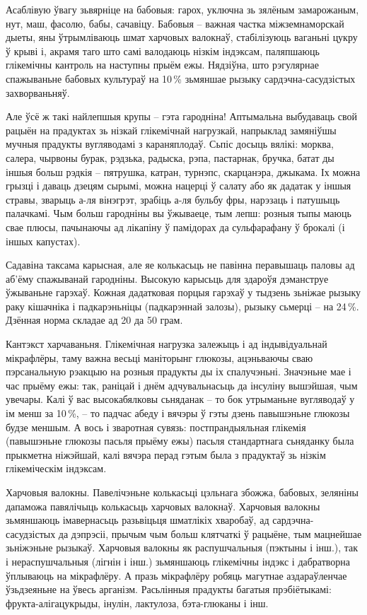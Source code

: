 Асаблівую ўвагу зьвярніце на бабовыя: гарох, уключна зь зялёным замарожаным, нут, маш, фасолю, бабы, сачавіцу. Бабовыя – важная частка міжземнаморскай дыеты, яны ўтрымліваюць шмат харчовых валокнаў, стабілізуюць ваганьні цукру ў крыві і, акрамя таго што самі валодаюць нізкім індэксам, паляпшаюць глікемічны кантроль на наступны прыём ежы. Нядзіўна, што рэгулярнае спажываньне бабовых культураў на 10\,\% зьмяншае рызыку сардэчна-сасудзістых захворваньняў.

Але ўсё ж такі найлепшыя крупы – гэта гародніна! Аптымальна выбудаваць свой рацыён на прадуктах зь нізкай глікемічнай нагрузкай, напрыклад замяніўшы мучныя прадукты вугляводамі з караняплодаў. Сьпіс досыць вялікі: морква, салера, чырвоны бурак, рэдзька, радыска, рэпа, пастарнак, бручка, батат ды іншыя больш рэдкія – пятрушка, катран, турнэпс, скарцанэра, джыкама. Іх можна грызці і даваць дзецям сырымі, можна нацерці ў салату або як дадатак у іншыя стравы, зварыць а-ля вінэгрэт, зрабіць а-ля бульбу фры, нарэзаць і патушыць палачкамі. Чым больш гародніны вы ўжываеце, тым лепш: розныя тыпы маюць свае плюсы, пачынаючы ад лікапіну ў памідорах да сульфарафану ў брокалі (і іншых капустах).

Садавіна таксама карысная, але яе колькасьць не павінна перавышаць паловы ад аб'ёму спажыванай гародніны. Высокую карысьць для здароўя дэманструе ўжываньне гарэхаў. Кожная дадатковая порцыя гарэхаў у тыдзень зьніжае рызыку раку кішачніка і падкарэньніцы (падкарэннай залозы), рызыку сьмерці – на 24\,\%. Дзённая норма складае ад 20 да 50 грам.

Кантэкст харчаваньня. Глікемічная нагрузка залежыць і ад індывідуальнай мікрафлёры, таму важна весьці маніторынг глюкозы, ацэньваючы сваю пэрсанальную рэакцыю на розныя прадукты ды іх спалучэньні. Значэньне мае і час прыёму ежы: так, раніцай і днём адчувальнасьць да інсуліну вышэйшая, чым увечары. Калі ў вас высокабялковы сьняданак – то бок утрыманьне вугляводаў у ім менш за 10\,\%, -- то падчас абеду і вячэры ў гэты дзень павышэньне глюкозы будзе меншым. А вось і зваротная сувязь: постпрандыяльная глікемія (павышэньне глюкозы пасьля прыёму ежы) пасьля стандартнага сьняданку была прыкметна ніжэйшай, калі вячэра перад гэтым была з прадуктаў зь нізкім глікеміческім індэксам.

Харчовыя валокны. Павелічэньне колькасьці цэльнага збожжа, бабовых, зеляніны дапаможа павялічыць колькасьць харчовых валокнаў. Харчовыя валокны зьмяншаюць імавернасьць разьвіцьця шматлікіх хваробаў, ад сардэчна-сасудзістых да дэпрэсіі, прычым чым больш клятчаткі ў рацыёне, тым мацнейшае зьніжэньне рызыкаў. Харчовыя валокны як распушчальныя (пэктыны і інш.), так і нераспушчальныя (лігнін і інш.) зьмяншаюць глікемічны індэкс і дабратворна ўплываюць на мікрафлёру. А празь мікрафлёру робяць магутнае аздараўленчае ўзьдзеяньне на ўвесь арганізм. Расьлінныя прадукты багатыя прэбіётыкамі: фрукта-алігацукрыды, інулін, лактулоза, бэта-глюканы і інш.

